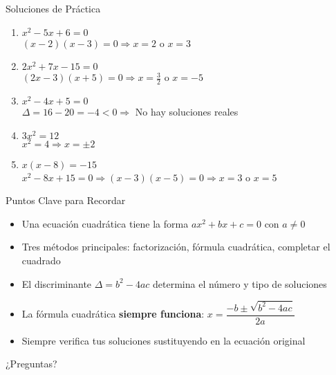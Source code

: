 \documentclass[aspectratio=169]{beamer}
\begin{document}
\begin{frame}{Soluciones de Práctica}
\begin{enumerate}
\item $x^2 - 5x + 6 = 0$ \\
{\color{myblue}$(x-2)(x-3)=0 \Rightarrow x=2$ o $x=3$}
\vspace{0.2cm}

\item $2x^2 + 7x - 15 = 0$ \\
{\color{myblue}$(2x-3)(x+5)=0 \Rightarrow x=\frac{3}{2}$ o $x=-5$}
\vspace{0.2cm}

\item $x^2 - 4x + 5 = 0$ \\
{\color{myred}$\Delta = 16-20 = -4 < 0 \Rightarrow$ No hay soluciones reales}
\vspace{0.2cm}

\item $3x^2 = 12$ \\
{\color{myblue}$x^2=4 \Rightarrow x=\pm 2$}
\vspace{0.2cm}

\item $x(x - 8) = -15$ \\
{\color{myblue}$x^2-8x+15=0 \Rightarrow (x-3)(x-5)=0 \Rightarrow x=3$ o $x=5$}
\end{enumerate}
\end{frame}

\begin{frame}{Puntos Clave para Recordar}
\begin{itemize}
\item<1-> Una ecuación cuadrática tiene la forma $ax^2 + bx + c = 0$ con $a \neq 0$
\vspace{0.3cm}
\item<2-> Tres métodos principales: factorización, fórmula cuadrática, completar el cuadrado
\vspace{0.3cm}
\item<3-> El discriminante $\Delta = b^2 - 4ac$ determina el número y tipo de soluciones
\vspace{0.3cm}
\item<4-> La fórmula cuadrática \textbf{siempre funciona}: $x = \dfrac{-b \pm \sqrt{b^2-4ac}}{2a}$
\vspace{0.3cm}
\item<5-> Siempre verifica tus soluciones sustituyendo en la ecuación original
\end{itemize}
\end{frame}

\begin{frame}
\begin{center}
\Huge ¿Preguntas?
\end{center}
\end{frame}
\end{document}
